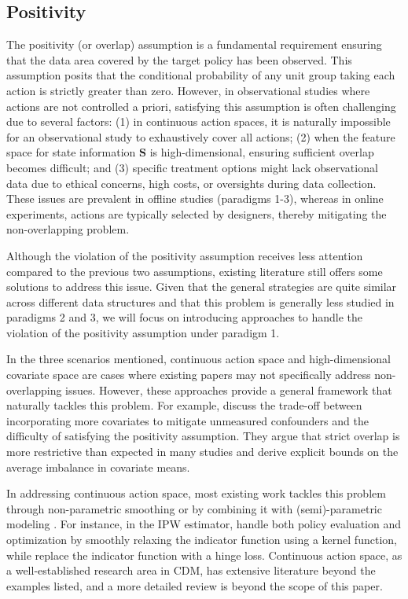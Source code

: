\subsection{Positivity}


The positivity (or overlap) assumption is a fundamental requirement ensuring that the data area covered by the target policy has been observed. This assumption posits that the conditional probability of any unit group taking each action is strictly greater than zero. However, in observational studies where actions are not controlled a priori, satisfying this assumption is often challenging due to several factors: (1) in continuous action spaces, it is naturally impossible for an observational study to exhaustively cover all actions; (2) when the feature space for state information $\boldsymbol{S}$ is high-dimensional, ensuring sufficient overlap becomes difficult; and (3) specific treatment options might lack observational data due to ethical concerns, high costs, or oversights during data collection. These issues are prevalent in offline studies (paradigms 1-3), whereas in online experiments, actions are typically selected by designers, thereby mitigating the non-overlapping problem.

Although the violation of the positivity assumption receives less attention compared to the previous two assumptions, existing literature still offers some solutions to address this issue. Given that the general strategies are quite similar across different data structures and that this problem is generally less studied in paradigms 2 and 3, we will focus on introducing approaches to handle the violation of the positivity assumption under paradigm 1.

In the three scenarios mentioned, continuous action space and high-dimensional covariate space are cases where existing papers may not specifically address non-overlapping issues. However, these approaches provide a general framework that naturally tackles this problem. For example, \citet{d2021overlap} discuss the trade-off between incorporating more covariates to mitigate unmeasured confounders and the difficulty of satisfying the positivity assumption. They argue that strict overlap is more restrictive than expected in many studies and derive explicit bounds on the average imbalance in covariate means.

In addressing continuous action space, most existing work tackles this problem through non-parametric smoothing \citep{kallus2018policy, chen2016personalized} or by combining it with (semi)-parametric modeling \citep{chernozhukov2019semi}. For instance, in the \acrshort{IPW} estimator, \citet{kallus2018policy} handle both policy evaluation and optimization by smoothly relaxing the indicator function using a kernel function, while \citet{chen2016personalized} replace the indicator function with a hinge loss. Continuous action space, as a well-established research area in \acrshort{CDM}, has extensive literature beyond the examples listed, and a more detailed review is beyond the scope of this paper.

